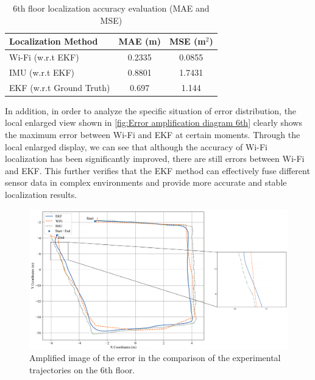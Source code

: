 \documentclass[12pt,a4paper]{article}
\numberwithin{equation}{section}
\begin{document}
\begin{table}[htbp]
\centering
\caption{6th floor localization accuracy evaluation (MAE and MSE)}
\label{tab:accuracy_evaluation_6th_floor} %
\begin{tabular}{lcc}
\toprule
\textbf{Localization Method} & \textbf{MAE (m)} & \textbf{MSE (m$^2$)} \\
\midrule

Wi-Fi (w.r.t EKF)                       & 0.2335                             & 0.0855                             \\ 
IMU (w.r.t EKF)                           & 0.8801                             & 1.7431                             \\ 
EKF (w.r.t Ground Truth) & 0.697 & 1.144 \\
\bottomrule
\end{tabular}
\end{table}
\noindent In addition, in order to analyze the specific situation of error distribution, the local enlarged view shown in \autoref{fig:Error amplification diagram 6th} clearly shows the maximum error between Wi-Fi and EKF at certain moments. Through the local enlarged display, we can see that although the accuracy of Wi-Fi localization has been significantly improved, there are still errors between Wi-Fi and EKF. This further verifies that the EKF method can effectively fuse different sensor data in complex environments and provide more accurate and stable localization results.
\begin{figure}[H]
    \centering
    \includegraphics[width=\linewidth]{Amplification images/wifi/half_circle_low_diff.png}
    \caption{Amplified image of the error in the comparison of the experimental trajectories on the 6th floor.}
     \label{fig:Error amplification diagram 6th}
\end{figure}
\end{document}
